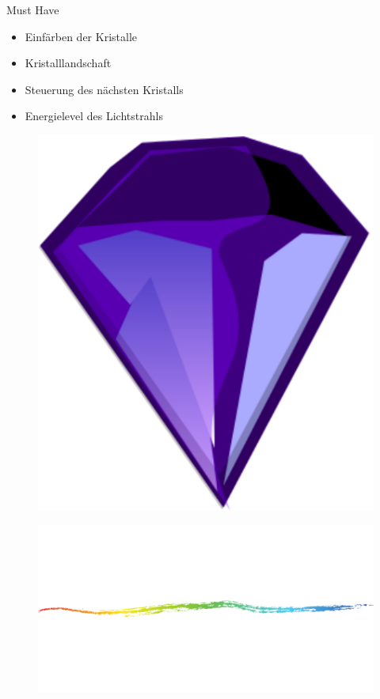 \begin{frame}{Must Have}
	\onetoone
	{
	\begin{itemize}
		\item Einfärben der Kristalle
		\item Kristalllandschaft
		\item Steuerung des nächsten Kristalls
		\item Energielevel des Lichtstrahls
	\end{itemize}
	}
	{
		\begin{figure}
			\centering
			\includegraphics[width=\textwidth, height=0.3\textheight, keepaspectratio]{images/diamond-308079}
		\end{figure}
	}
	\begin{figure}
		\centering
		\includegraphics[width=\textwidth, height=0.7\textheight, keepaspectratio]{images/chalk-154720}
	\end{figure}
\end{frame} 

